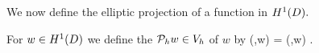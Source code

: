 



We now define the elliptic projection of a function in $\HoD.$%

For $w \in \HoD$ we define the  $\mathcal P_{h} w \in V_{h}$ of $w$ by
\beq\label{eq:ellproj}
\api(\vh,\Ph w) = \api(\vh,w) \tfa \vh \in \Vh.
\eeq
\ede



